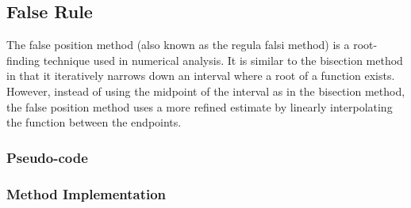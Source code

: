 \documentclass{article}
\begin{document}
    \subsection{False Rule}\label{subsec:false_rule}

    The false position method (also known as the regula falsi method) is a root-finding technique used in numerical analysis.
    It is similar to the bisection method in that it iteratively narrows down an interval where a root of a function exists.
    However, instead of using the midpoint of the interval as in the bisection method, the false position method uses a
    more refined estimate by linearly interpolating the function between the endpoints.

\subsubsection{Pseudo-code}

    \subsubsection{Method Implementation}
\end{document}
